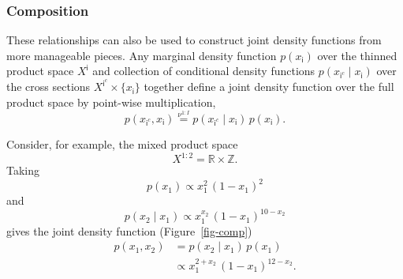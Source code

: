 \documentclass[
  letterpaper,
  DIV=11,
  numbers=noendperiod]{scrartcl}
\begin{document}
\subsubsection{Composition}\label{composition}

These relationships can also be used to construct joint density
functions from more manageable pieces. Any marginal density function
\(p( x_{ \mathsf{i} } )\) over the thinned product space
\(X^{ \mathsf{i} }\) and collection of conditional density functions
\(p( x_{\mathsf{i}^{c}} \mid x_{ \mathsf{i} } )\) over the cross
sections \(X^{\mathsf{i}^{c}} \times \{ x_{ \mathsf{i} } \}\) together
define a joint density function over the full product space by
point-wise multiplication, \[
p( x_{\mathsf{i}^{c}}, x_{ \mathsf{i} } )
\overset{ \nu^{1:I} }{=}
p( x_{\mathsf{i}^{c}} \mid x_{ \mathsf{i} } ) \,
p( x_{ \mathsf{i} } ).
\]

Consider, for example, the mixed product space \[
X^{1:2} = \mathbb{R} \times \mathbb{Z}.
\] Taking \[
p( x_{1} ) \propto x_{1}^{2} \, (1 - x_{1})^{2}
\] and \[
p( x_{2} \mid x_{1} )
\propto
x_{1}^{ x_{2} } \, ( 1 - x_{1} )^{10 - x_{2} }
\] gives the joint density function (Figure~\ref{fig-comp})
\begin{align*}
p( x_{1}, x_{2} )
&=
p( x_{2} \mid x_{1} ) \, p( x_{1} )
\\
&\propto
x_{1}^{ 2 + x_{2} } \, ( 1 - x_{1} )^{ 12 - x_{2} }.
\end{align*}
\end{document}
